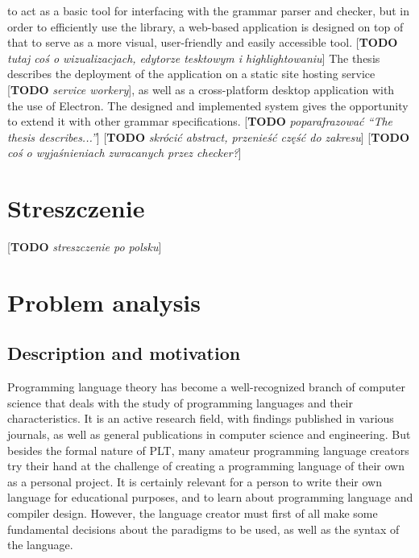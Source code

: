 \documentclass[english,engineering]{wizthesis}
\newcommand{\todo}[1]{{\color{red}[\textbf{TODO} \textit{#1}]}}
\begin{document}
to act as a basic tool for interfacing with the grammar parser and checker, but
in order to efficiently use the library, a web-based application is designed on
top of that to serve as a more visual, user-friendly and easily accessible tool.
\todo{tutaj coś o wizualizacjach, edytorze tesktowym i highlightowaniu} The
thesis describes the deployment of the application on a static site hosting
service \todo{service workery}, as well as a cross-platform desktop application
with the use of Electron. The designed and implemented system gives the
opportunity to extend it with other grammar specifications.
\todo{poparafrazować ``The thesis describes...''}
\todo{skrócić abstract, przenieść część do zakresu}
\todo{coś o wyjaśnieniach zwracanych przez checker?}

{\let\clearpage\relax %
\chapter*{Streszczenie}

\todo{streszczenie po polsku}
}

\tableofcontents

\mainmatter %

\chapter{Problem analysis}

\section{Description and motivation} \label{sec:description-and-motivation}

Programming language theory has become a well-recognized branch of computer
science that deals with the study of programming languages and their
characteristics. It is an active research field, with findings published in
various journals, as well as general publications in computer science and
engineering. But besides the formal nature of PLT, many amateur programming
language creators try their hand at the challenge of creating a programming
language of their own as a personal project. It is certainly relevant for a
person to write their own language for educational purposes, and to learn about
programming language and compiler design. However, the language creator must
first of all make some fundamental decisions about the paradigms to be used, as
well as the syntax of the language.
\end{document}
